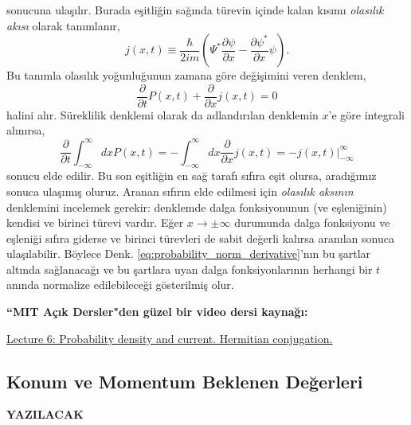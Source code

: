 \documentclass[a4paper,12pt, twoside]{article}
\newcommand{\YAZILACAK}{{\vspace{18pt}\bf\Large \color{red} YAZILACAK}}
\begin{document}
sonucuna ulaşılır. Burada eşitliğin sağında türevin içinde kalan kısımı \emph{olasılık akısı} olarak tanımlanır,
\begin{equation}
j(x,t)\equiv \dfrac {\hbar }{2im}\left( \Psi ^{\ast }\dfrac {\partial \psi }{\partial x}-\dfrac {\partial \psi ^{\ast }}{\partial x}\psi \right).
\label{eq:probability_current}
\end{equation}
Bu tanımla olasılık yoğunluğunun zamana göre değişimini veren denklem,
\begin{equation}
\dfrac {\partial }{\partial t}P\left( x,t\right) +\dfrac {\partial }{\partial x}j\left( x,t\right) =0
\label{eq:continuity_equation}
\end{equation}
halini alır. Süreklilik denklemi olarak da adlandırılan denklemin $x$'e göre integrali alınırsa,
\begin{equation}
\dfrac {\partial }{\partial t}\int ^{\infty }_{-\infty }dxP\left( x,t\right) =-\int ^{\infty }_{-\infty }dx\dfrac {\partial }{\partial x}j\left( x,t\right) = -j(x,t)\bigg|^{\infty}_{-\infty}
\end{equation}
sonucu elde edilir. Bu son eşitliğin en sağ tarafı sıfıra eşit olursa, aradığımız sonuca ulaşımış oluruz. Aranan sıfırın elde edilmesi için \emph{olasılık aksının} denklemini incelemek gerekir: denklemde dalga fonksiyonunun (ve eşleniğinin) kendisi ve birinci türevi vardır. Eğer $x\rightarrow\pm\infty$ durumunda dalga fonksiyonu ve eşleniği sıfıra giderse ve birinci türevleri de sabit değerli kalırsa aranılan sonuca ulaşılabilir. Böylece Denk. \ref{eq:probability_norm_derivative}'nın bu şartlar altında sağlanacağı ve bu şartlara uyan dalga fonksiyonlarının herhangi bir $t$ anında normalize edilebileceği gösterilmiş olur. 

\vspace{18pt}
{\bf ``MIT Açık Dersler"den güzel bir video dersi kaynağı:}

\href{https://ocw.mit.edu/courses/physics/8-04-quantum-physics-i-spring-2016/video-lectures/part-1/}{Lecture 6: Probability density and current. Hermitian conjugation.}


\subsection{Konum ve Momentum Beklenen Değerleri}

\YAZILACAK

\newpage
\renewcommand\refname{Kaynaklar}
{}
 
\end{document}

